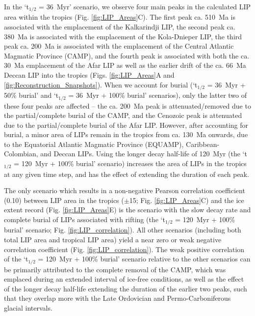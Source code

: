 \documentclass[11pt,letterpaper]{article}
\begin{document}
In the `t$_{1/2}$ = 36~Myr' scenario, we observe four main peaks in the calculated LIP area within the tropics (Fig. \ref{fig:LIP_Areas}C). The first peak ca. 510~Ma is associated with the emplacement of the Kalkarindji LIP, the second peak ca. 380~Ma is associated with the emplacement of the Kola-Dnieper LIP, the third peak ca. 200~Ma is associated with the emplacement of the Central Atlantic Magmatic Province (CAMP), and the fourth peak is associated with both the ca. 30~Ma emplacement of the Afar LIP as well as the earlier drift of the ca. 66~Ma Deccan LIP into the tropics (Figs. \ref{fig:LIP_Areas}A and \ref{fig:Reconstruction_Snapshots}). When we account for burial (`t$_{1/2}$ = 36~Myr + 50\% burial' and `t$_{1/2}$ = 36~Myr + 100\% burial' scenarios), only the latter two of these four peaks are affected -- the ca. 200~Ma peak is attenuated/removed due to the partial/complete burial of the CAMP, and the Cenozoic peak is attenuated due to the partial/complete burial of the Afar LIP. However, after accounting for burial, a minor area of LIPs remain in the tropics from ca. 130~Ma onwards, due to the Equatorial Atlantic Magmatic Province (EQUAMP), Caribbean-Colombian, and Deccan LIPs. Using the longer decay half-life of 120~Myr (the `t$_{1/2}$ = 120~Myr + 100\% burial' scenario) increases the area of LIPs in the tropics at any given time step, and has the effect of extending the duration of each peak.

The only scenario which results in a non-negative Pearson correlation coefficient (0.10) between LIP area in the tropics ($\pm$15\textdegree; Fig. \ref{fig:LIP_Areas}C) and the ice extent record (Fig. \ref{fig:LIP_Areas}E) is the scenario with the slow decay rate and complete burial of LIPs associated with rifting (the `t$_{1/2}$ = 120~Myr + 100\% burial' scenario; Fig. \ref{fig:LIP_correlation}). All other scenarios (including both total LIP area and tropical LIP area) yield a near zero or weak negative correlation coefficient (Fig. \ref{fig:LIP_correlation}). The weak positive correlation of the `t$_{1/2}$ = 120~Myr + 100\% burial' scenario relative to the other scenarios can be primarily attributed to the complete removal of the CAMP, which was emplaced during an extended interval of ice-free conditions, as well as the effect of the longer decay half-life extending the duration of the earlier two peaks, such that they overlap more with the Late Ordovician and Permo-Carboniferous glacial intervals.
\end{document}
